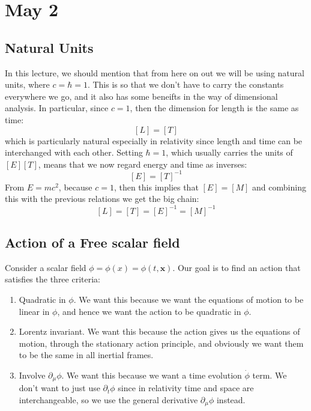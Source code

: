 \section{May 2}

\subsection{Natural Units}
In this lecture, we should mention that from here on out we will be using natural units, where \( c = \hbar = 1
\). This is so that we don't have to carry the constants everywhere we go, and it also has some beneifts in
the way of dimensional analysis. In particular, since \( c = 1 \), then the dimension for length is the same
as time:
\[
	[L] = [T]
\]
which is particularly natural especially in relativity since length and time can be interchanged with each
other. Setting \( \hbar = 1 \), which usually carries the units of \( [E][T] \), means that we now regard
energy and time as inverses:
\[
	[E] = [T]^{-1}
\]
From \( E = mc^2 \), because \( c = 1 \), then this implies that \( [E] = [M] \) and combining this with the
previous relations we get the big chain:
\[
	[L] = [T] = [E]^{-1} = [M]^{-1}
\]
\subsection{Action of a Free scalar field}
Consider a scalar field \( \phi = \phi(x) = \phi(t, \mathbf{x}) \). Our goal is to find an action that
satisfies the three criteria:
\begin{enumerate}[label=\arabic*.]
	\item Quadratic in \( \phi \). We want this because we want the equations of motion to be linear in \(
		\phi \), and hence we want the action to be quadratic in \( \phi \). 
	\item Lorentz invariant. We want this because the action gives us the equations of motion, through the
		stationary action principle, and obviously we want them to be the same in all inertial frames.   
	\item Involve \( \partial_\mu \phi \). We want this because we want a time evolution \( \dot \phi \)
		term. We don't want to just use \( \partial_t \phi \) since in relativity time and space are
		interchangeable, so we use the general derivative \( \partial_\mu \phi \) instead. 
\end{enumerate}

